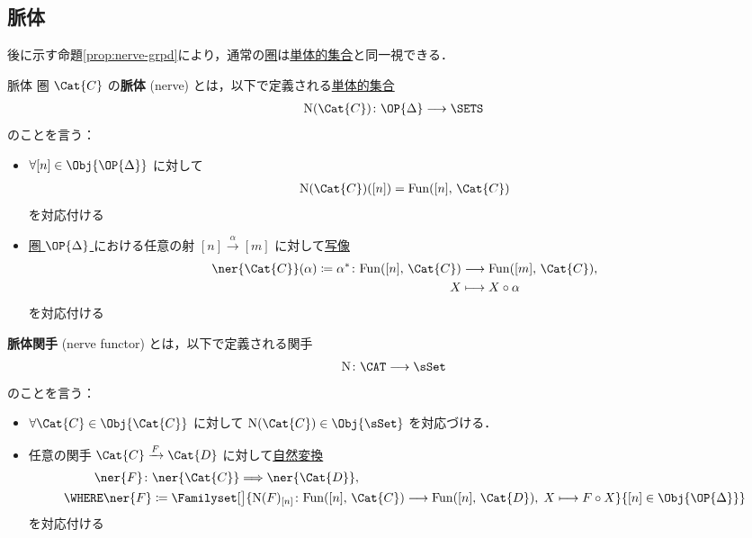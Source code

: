 \documentclass[TQFT_main]{subfiles}
\begin{document}
\subsection{脈体}

後に示す命題\ref{prop:nerve-grpd}により，通常の\hyperref[def:category]{圏}は\hyperref[def:SimpSet]{単体的集合}と同一視できる．

\begin{mydef}[label=def:nerve,breakable]{脈体}
        圏 $\Cat{C}$ の\textbf{脈体} (nerve) とは，以下で定義される\hyperref[def:SimpSet]{単体的集合}
        \begin{align}
            \mathrm{N}(\Cat{C}) \colon \OP{\Delta} \lto \SETS
        \end{align}
        のことを言う：
        \begin{itemize}
            \item $\forall [n] \in \Obj{\OP{\Delta}}$ に対して
            \begin{align}
                \mathrm{N}(\Cat{C}) ([n]) = \mathrm{Fun} ([n],\, \Cat{C})
            \end{align}
            を対応付ける
            \item \hyperref[def:simplex-cat]{圏 $\OP{\Delta}$ }における任意の射 $[n] \xrightarrow{\alpha} [m]$ に対して\underline{写像}
            \begin{align}
                \ner{\Cat{C}}(\alpha) \coloneqq \alpha^* \colon \mathrm{Fun}([n],\, \Cat{C}) &\lto \mathrm{Fun}([m],\, \Cat{C}),\\ 
                X &\lmto X \circ \alpha
            \end{align}
            を対応付ける
        \end{itemize}

        \tcblower

        \textbf{脈体関手} (nerve functor) とは，以下で定義される関手
        \begin{align}
            \mathrm{N} \colon \CAT \lto \sSet
        \end{align}
        のことを言う：
        \begin{itemize}
            \item $\forall \Cat{C} \in \Obj{\Cat{C}}$ に対して $\mathrm{N}(\Cat{C}) \in \Obj{\sSet}$ を対応づける．
            \item 任意の関手 $\Cat{C} \xrightarrow{F} \Cat{D}$ に対して\hyperref[def:nat]{自然変換}
            \begin{align}
                \ner{F} \colon &\ner{\Cat{C}} \Longrightarrow \ner{\Cat{D}}, \\
                \WHERE \ner{F} &\coloneqq \Familyset[\big]{\mathrm{N}(F)_{[n]} \colon \mathrm{Fun}([n],\, \Cat{C}) \lto \mathrm{Fun}([n],\, \Cat{D}),\; X \lmto F \circ X}{[n] \in \Obj{\OP{\Delta}}}
            \end{align}
            を対応付ける
        \end{itemize}
\end{mydef}
\end{document}
